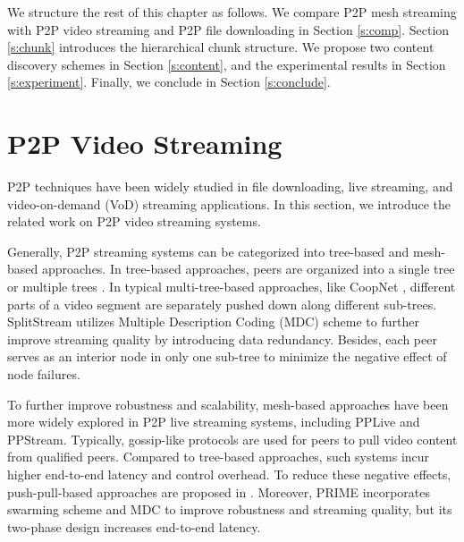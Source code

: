    We structure the rest of this chapter as follows.  
    We
    compare P2P mesh streaming with P2P video streaming and
    P2P file downloading in Section \ref{s:comp}.  
    Section \ref{s:chunk} introduces the hierarchical chunk structure.
    We propose two content discovery schemes
    in Section \ref{s:content}, and the experimental results in Section
    \ref{s:experiment}.
    Finally, we conclude in Section \ref{s:conclude}.

\section{P2P Video Streaming}
\label{ss:related_p2p}
P2P techniques have been widely studied in file downloading, live
streaming, and video-on-demand (VoD) streaming applications. In this section,
we introduce the related work on P2P video streaming systems.

Generally, P2P streaming systems can be categorized into tree-based
and mesh-based approaches. In tree-based approaches, peers are
organized into a single tree \cite{jannotti:overcast, chu:narada}
or multiple trees \cite{castro:splitstream,
padmanabhan:coopnet}.
In typical multi-tree-based
approaches, like CoopNet \cite{padmanabhan:coopnet}, different parts of a video segment are
separately pushed down along different sub-trees. SplitStream
\cite{castro:splitstream}
utilizes Multiple Description Coding (MDC) scheme to further improve
streaming quality by introducing data redundancy. Besides, each peer
serves as an interior node in only one sub-tree to minimize the
negative effect of node failures. 

To further improve robustness and scalability, mesh-based approaches
have been more widely explored in P2P live streaming systems,
including PPLive and PPStream. Typically, gossip-like protocols are
used for peers to pull video content from qualified peers. Compared to
tree-based approaches, such systems incur higher end-to-end latency
and control overhead. To reduce these negative effects,
push-pull-based approaches are proposed in \cite{zhang:coolstreaming}. 
Moreover, PRIME \cite{magharei:prime}
incorporates swarming scheme and MDC to improve robustness and
streaming quality, but its two-phase design increases end-to-end
latency.

